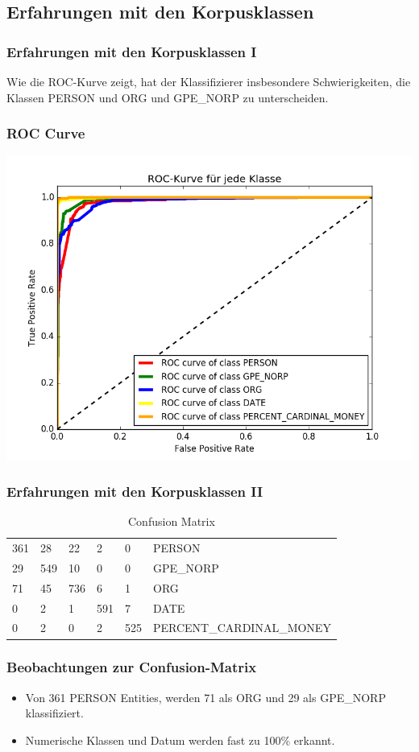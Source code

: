 \documentclass{beamer}
\begin{document}
	\subsection{Erfahrungen mit den Korpusklassen}
	\begin{frame}
		\frametitle{Erfahrungen mit den Korpusklassen I}
		Wie die ROC-Kurve zeigt, hat der Klassifizierer insbesondere Schwierigkeiten, die Klassen PERSON und ORG und GPE\_NORP zu unterscheiden.\\
	\end{frame}
	\begin{frame}
		\frametitle{ROC Curve}
		\includegraphics[scale=0.54]{roc_curve.png}
	\end{frame}
		\begin{frame}
			\frametitle{Erfahrungen mit den Korpusklassen II}
			\begin{table}
				\caption{Confusion Matrix}
				\begin{tabularx}{\textwidth}{llllll}
					\toprule
					361 & 28 & 22 & 2 & 0 & PERSON\\
					29 & 549 & 10 & 0 & 0 & GPE\_NORP\\
					71 & 45 & 736 & 6 & 1 & ORG\\
					0 & 2 & 1 & 591 & 7 & DATE\\
					0 & 2 & 0 & 2 & 525 & PERCENT\_CARDINAL\_MONEY\\
					\bottomrule
				\end{tabularx}
				\label{tab:allf2}
			\end{table}			
		\end{frame}
	\begin{frame}
		\frametitle{Beobachtungen zur Confusion-Matrix}
		\begin{itemize}
			\item Von 361 PERSON Entities, werden 71 als ORG und 29 als GPE\_NORP klassifiziert.

			\item Numerische Klassen und Datum werden fast zu 100\% erkannt.
		\end{itemize}
	\end{frame}	
\end{document}
